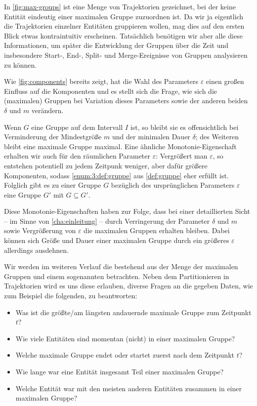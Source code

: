 In \cref{fig:max-groups} ist eine Menge von Trajektorien gezeichnet, bei der keine Entität eindeutig einer maximalen Gruppe zuzuordnen ist.
Da wir ja eigentlich die Trajektorien einzelner Entitäten gruppieren wollen, mag dies auf den ersten Blick etwas kontraintuitiv erscheinen.
Tatsächlich benötigen wir aber alle diese Informationen, um später die Entwicklung der Gruppen über die Zeit und insbesondere Start-, End-, Split- und Merge-Ereignisse von Gruppen analysieren zu können.

Wie \cref{fig:components} bereits zeigt, hat die Wahl des Parameters $\varepsilon$ einen großen Einfluss auf die Komponenten und es stellt sich die Frage, wie sich die (maximalen) Gruppen bei Variation dieses Parameters sowie der anderen beiden $\delta$ und $m$ verändern.

Wenn $G$ eine Gruppe auf dem Intervall $I$ ist, so bleibt sie es offensichtlich bei Verminderung der Mindestgröße $m$ und der minimalen Dauer $\delta$; des Weiteren bleibt eine maximale Gruppe maximal.
Eine ähnliche Monotonie-Eigenschaft erhalten wir auch für den räumlichen Parameter $\varepsilon$:
Vergrößert man $\varepsilon$, so entstehen potentiell zu jedem Zeitpunk weniger, aber dafür größere Komponenten, sodass \cref{enum:3:def:gruppe} aus \cref{def:gruppe} eher erfüllt ist.
Folglich gibt es zu einer Gruppe $G$ bezüglich des ursprünglichen Parameters $\varepsilon$ eine Gruppe $G'$ mit $G \subseteq G'$.

Diese Monotonie-Eigenschaften haben zur Folge, dass bei einer detaillierten Sicht -- im Sinne von \cref{cha:einleitung} -- durch Verringerung der Parameter $\delta$ und $m$ sowie Vergrößerung von $\varepsilon$ die maximalen Gruppen erhalten bleiben.
Dabei können sich Größe und Dauer einer maximalen Gruppe durch ein größeres $\varepsilon$ allerdings ausdehnen.

Wir werden im weiteren Verlauf die \Index{\GrpStruktur} bestehend aus der Menge der maximalen Gruppen und einem sogenannten  betrachten.
Neben dem Partitionieren in Trajektorien wird es uns diese \GrpStruktur erlauben, diverse Fragen an die gegeben Daten, wie zum Beispiel die folgenden, zu beantworten:
\begin{itemize}
	\item Was ist die größte/am längsten andauernde maximale Gruppe zum Zeitpunkt $t$?
	\item Wie viele Entitäten sind momentan (nicht) in einer maximalen Gruppe?
	\item Welche maximale Gruppe endet oder startet zuerst nach dem Zeitpunkt $t$?
	\item Wie lange war eine Entität insgesamt Teil einer maximalen Gruppe?
	\item Welche Entität war mit den meisten anderen Entitäten zusammen in einer maximalen Gruppe?
\end{itemize}

